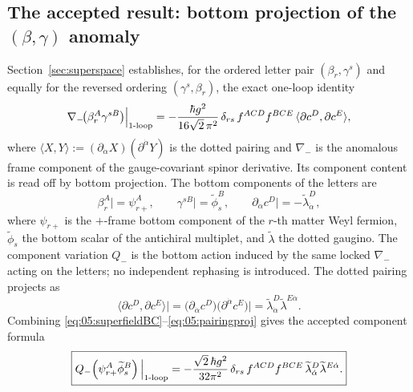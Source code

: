 \subsection{The accepted result: bottom projection of the
\texorpdfstring{$(\beta,\gamma)$}{(beta,gamma)} anomaly}%
\label{sec:component:accepted}

Section~\ref{sec:superspace} establishes, for the ordered letter pair
$(\beta_r,\gamma^s)$ and equally for the reversed ordering
$(\gamma^s,\beta_r)$, the exact one-loop identity
\begin{equation}\label{eq:05:superfieldBC}
\nabla_-\!\big(\beta_r^{A}\gamma^{sB}\big)\Big|_{\text{1-loop}}
=-\frac{\hbar g^{2}}{16\sqrt2\,\pi^{2}}\,\delta_{rs}\,f^{ACD}f^{BCE}\,
\langle\partial c^{D},\partial c^{E}\rangle ,
\end{equation}
where $\langle X,Y\rangle:=(\partial_{\dot\alpha}X)(\partial^{\dot\alpha}Y)$
is the dotted pairing and $\nabla_-$ is the anomalous frame component of the
gauge-covariant spinor derivative. Its component content is read off by bottom
projection. The bottom components of the letters are
\begin{equation}\label{eq:05:bottomproj}
\beta_r^{A}\big|=\psi_{r+}^{A},
\qquad
\gamma^{sB}\big|=\widetilde\phi_s^{B},
\qquad
\partial_{\dot\alpha}c^{D}\big|=-\widetilde\lambda_{\dot\alpha}^{D},
\end{equation}
where $\psi_{r+}$ is the $+$-frame bottom component of the $r$-th matter Weyl
fermion, $\widetilde\phi_s$ the bottom scalar of the antichiral multiplet, and
$\widetilde\lambda$ the dotted gaugino. The component variation $Q_-$ is the
bottom action induced by the same locked $\nabla_-$ acting on the letters; no
independent rephasing is introduced. The dotted pairing projects as
\begin{equation}\label{eq:05:pairingproj}
\langle\partial c^{D},\partial c^{E}\rangle\Big|
=\big(\partial_{\dot\alpha}c^{D}\big)\big(\partial^{\dot\alpha}c^{E}\big)\Big|
=\widetilde\lambda_{\dot\alpha}^{D}\widetilde\lambda^{E\dot\alpha}.
\end{equation}
Combining \eqref{eq:05:superfieldBC}--\eqref{eq:05:pairingproj} gives the
accepted component formula
\begin{equation}\label{eq:05:bccomponent}
\boxed{
Q_-\!\left(\psi_{r+}^{A}\widetilde\phi_s^{B}\right)\Big|_{\text{1-loop}}
=-\frac{\sqrt2\,\hbar g^{2}}{32\pi^{2}}\,\delta_{rs}\,f^{ACD}f^{BCE}\,
\widetilde\lambda_{\dot\alpha}^{D}\widetilde\lambda^{E\dot\alpha}.}
\end{equation}

